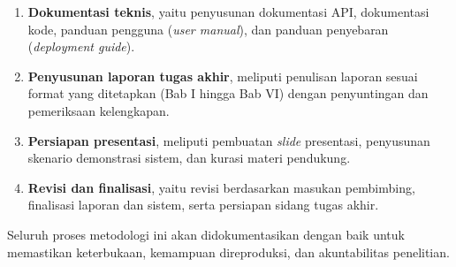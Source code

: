 \begin{enumerate}[label=\alph*.]
  \item \textbf{Dokumentasi teknis}, yaitu penyusunan dokumentasi API, dokumentasi kode, panduan pengguna (\textit{user manual}), dan panduan penyebaran (\textit{deployment guide}).
  
  \item \textbf{Penyusunan laporan tugas akhir}, meliputi penulisan laporan sesuai format yang ditetapkan (Bab I hingga Bab VI) dengan penyuntingan dan pemeriksaan kelengkapan.
  
  \item \textbf{Persiapan presentasi}, meliputi pembuatan \textit{slide} presentasi, penyusunan skenario demonstrasi sistem, dan kurasi materi pendukung.
  
  \item \textbf{Revisi dan finalisasi}, yaitu revisi berdasarkan masukan pembimbing, finalisasi laporan dan sistem, serta persiapan sidang tugas akhir.
\end{enumerate}

\vspace{0.5cm}
\noindent Seluruh proses metodologi ini akan didokumentasikan dengan baik untuk memastikan keterbukaan, kemampuan direproduksi, dan akuntabilitas penelitian.